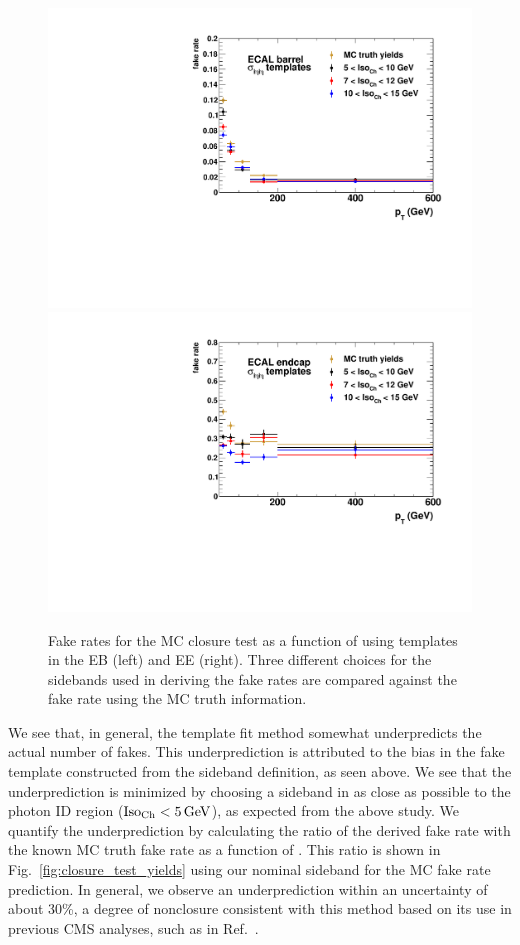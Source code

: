 \begin{figure}[!htbp]
  \centering
  \includegraphics[scale=0.40]{figures/closure_test_fake_rates_sieie_EB.pdf}
  \includegraphics[scale=0.40]{figures/closure_test_fake_rates_sieie_EE.pdf}
  \caption{Fake rates for the MC closure test as a function of \pt using \sieie templates in the EB (left) and EE (right). Three different choices for the \chiso sidebands used in deriving the fake rates are compared against the fake rate using the MC truth information.}
  \label{fig:closure_test_fake_rates_sieie}
\end{figure}

We see that, in general, the template fit method somewhat underpredicts the actual number of fakes. This underprediction is attributed to the bias in the fake template constructed from the sideband definition, as seen above. We see that the underprediction is minimized by choosing a sideband in \chiso as close as possible to the photon ID region ($\text{Iso}_{\text{Ch}} < 5\,\text{Ge\hspace{-.08em}V}$), as expected from the above study. We quantify the underprediction by calculating the ratio of the derived fake rate with the known MC truth fake rate as a function of \pt. This ratio is shown in Fig.~\ref{fig:closure_test_yields} using our nominal \chiso sideband for the MC fake rate prediction. In general, we observe an underprediction within an uncertainty of about 30\%, a degree of nonclosure consistent with this method based on its use in previous CMS analyses, such as in Ref.~\cite{CMS-PAS-EXO-12-045}.

